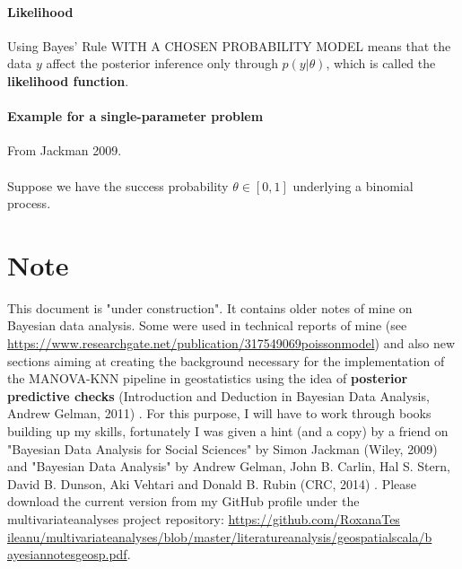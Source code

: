 \documentclass {article}
\begin{document}
\paragraph{Likelihood}
Using Bayes' Rule WITH A CHOSEN PROBABILITY MODEL means that the data $y$ affect the posterior inference only through $p(y | \theta)$, which is called the \textbf{likelihood function}. 

\paragraph {Example for a single-parameter problem}
From Jackman 2009.
\\
\\
Suppose we have the success probability $\theta \in [0,1]$ underlying a binomial process.  

\section* {Note}
This document is "under construction".
 It contains older notes of mine on Bayesian data analysis.
 Some were used in technical reports of mine (see \href{https://www.researchgate.net/publication/317549069_poisson_model}{https://www.researchgate.net/publication/317549069\underline{\space}poisson\underline{\space}model}) and also new sections aiming at creating the background necessary for the implementation of the MANOVA-KNN pipeline in geostatistics using the idea of \textbf{posterior predictive checks} (Introduction and Deduction in Bayesian Data Analysis, Andrew Gelman, 2011) \cite{gelman_introduction_2011}.
 For this purpose, I will have to work through books building up my skills, fortunately I was given a hint (and a copy) by a friend on "Bayesian Data Analysis for Social Sciences" by Simon Jackman (Wiley, 2009) \cite{jackman_bayesian_2009} and "Bayesian Data Analysis" by Andrew Gelman, John B. Carlin, Hal S. Stern, David B. Dunson, Aki Vehtari and Donald B. Rubin (CRC, 2014) \cite{gelman_bayesian_2014}.    
Please download the current version from  my GitHub profile under the multivariate\underline{\space}analyses project repository: \href{https://github.com/RoxanaTesileanu/multivariate_analyses/blob/master/literature_analysis/geospatial_scala/bayesian_notes_geosp.tex}{https://github.com/RoxanaTes\\ileanu/multivariate\underline{\space}analyses/blob/master/literature\underline{\space}analysis/geospatial\underline{\space}scala/b\\ayesian\underline{\space}notes\underline{\space}geosp.pdf}. 
\end{document}
